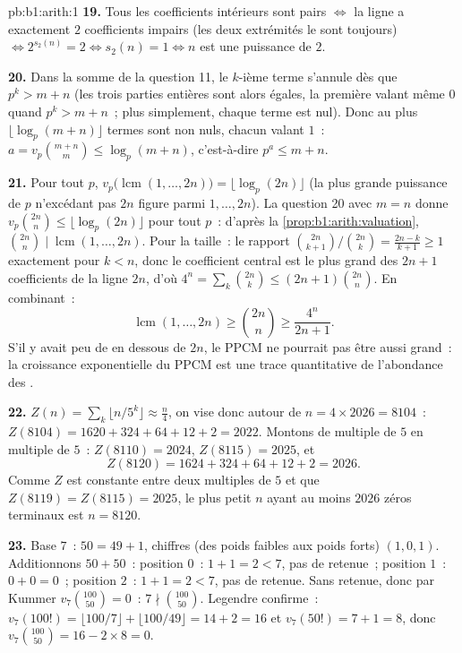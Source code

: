 \begin{solution}{pb:b1:arith:1}
\textbf{19.} Tous les coefficients intérieurs sont pairs $\iff$ la ligne a exactement
$2$ coefficients impairs (les deux extrémités le sont toujours) $\iff 2^{s_2(n)} =
2 \iff s_2(n) = 1 \iff n$ est une puissance de $2$.

\textbf{20.} Dans la somme de la question 11, le $k$-ième terme s'annule dès
que $p^k > m + n$ (les trois parties entières sont alors égales, la
première valant même $0$ quand $p^k > m+n$~; plus simplement, chaque terme est nul).
Donc au plus $\lfloor \log_p(m+n)\rfloor$ termes sont non nuls, chacun
valant $1$~: $a = v_p\binom{m+n}m \leq \log_p(m+n)$, c'est-à-dire $p^a \leq
m + n$.

\textbf{21.} Pour tout  $p$, $v_p\bigl(\operatorname{lcm}(1,
\dots, 2n)\bigr) = \lfloor\log_p(2n)\rfloor$ (la plus grande puissance de
$p$ n'excédant pas $2n$ figure parmi $1, \dots, 2n$). La question 20
avec $m = n$ donne $v_p\binom{2n}n \leq \lfloor\log_p(2n)\rfloor$
pour tout $p$~: d'après la \cref{prop:b1:arith:valuation}, $\binom{2n}n
\mid \operatorname{lcm}(1, \dots, 2n)$. Pour la taille~: le rapport
$\binom{2n}{k+1}/\binom{2n}k = \frac{2n-k}{k+1} \geq 1$ exactement
pour $k < n$, donc le coefficient central est le plus grand des $2n + 1$
coefficients de la ligne $2n$, d'où $4^n = \sum_k \binom{2n}k \leq
(2n+1)\binom{2n}n$. En combinant~:
\[
\operatorname{lcm}(1, \dots, 2n) \geq \binom{2n}n \geq
\frac{4^n}{2n + 1} .
\]
S'il y avait peu de  en dessous de $2n$, le PPCM ne pourrait pas être aussi
grand~: la croissance exponentielle du PPCM est une trace quantitative de
l'abondance des .

\textbf{22.} $Z(n) = \sum_k\lfloor n/5^k\rfloor \approx \frac
n4$, on vise donc autour de $n = 4 \times 2026 = 8104$~: $Z(8104) = 1620 +
324 + 64 + 12 + 2 = 2022$. Montons de multiple de $5$ en multiple de $5$~: $Z(8110)
= 2024$, $Z(8115) = 2025$, et
\[
Z(8120) = 1624 + 324 + 64 + 12 + 2 = 2026 .
\]
Comme $Z$ est constante entre deux multiples de $5$ et que $Z(8119) =
Z(8115) = 2025$, le plus petit $n$ ayant au moins $2026$ zéros
terminaux est $n = 8120$.

\textbf{23.} Base $7$~: $50 = 49 + 1$, chiffres (des poids faibles aux poids forts) $(1, 0,
1)$. Additionnons $50 + 50$~: position $0$~: $1 + 1 = 2 < 7$, pas de retenue~;
position $1$~: $0 + 0 = 0$~; position $2$~: $1 + 1 = 2 < 7$, pas de
retenue. Sans retenue, donc par Kummer $v_7\binom{100}{50} = 0$~: $7 \nmid
\binom{100}{50}$. Legendre confirme~: $v_7(100!) = \lfloor 100/7
\rfloor + \lfloor 100/49 \rfloor = 14 + 2 = 16$ et $v_7(50!) = 7
+ 1 = 8$, donc $v_7\binom{100}{50} = 16 - 2\times8 = 0$.


\end{solution}
